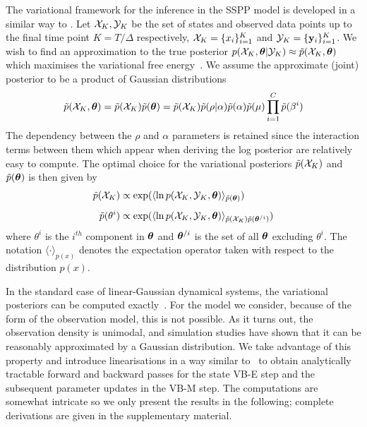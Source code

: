 \documentclass[12pt]{article}
\begin{document}
The variational framework for the inference in the SSPP model is developed in a similar way to
\cite{Beal_2003b}. Let $\mathcal{X}_K, \mathcal{Y}_K$ be the set of states and observed data points up to the final
time point $K = T/\Delta$ respectively, $\mathcal{X}_K = \{x_i\}_{i=1}^K$ and $\mathcal{Y}_K = \{{\bf y}_i\}_{i=1}^K$. We
wish to find an approximation to the true posterior $p(\mathcal{X}_K,{\bm \theta} | \mathcal{Y}_K) \approx
\tilde{p}(\mathcal{X}_K,{\bm \theta})$ which maximises the variational free energy~\cite{Attias_1999}. We assume the
approximate (joint) posterior to be a product of Gaussian distributions \begin{equation}\label{eq:
	VarApproximation} \pt(\X_K,\thetab)=
	\pt(\X_K)\pt(\thetab)=\pt(\X_K)\pt(\rho|\alpha)\pt(\alpha)\pt(\mu)\prod_{i=1}^C\pt(\beta^i)
\end{equation} The dependency between the $\rho$ and $\alpha$ parameters is retained since the
interaction terms between them which appear when deriving the log posterior are relatively easy to
compute.  The optimal choice for the variational posteriors $\tilde{p}(\mathcal{X}_K)$ and $\tilde{p}({\bm \theta})$  is then
given by \begin{subequations}\label{eq:VBmarginals} \begin{align} \pt(\X_K)&\propto \exp(\langle\ln
	p(\X_K,\Y_K,\thetab)\rangle_{\pt(\thetab)}) \label{eq:xkmarginal}\\[1ex]
	\pt(\theta^i)&\propto \exp(\langle\ln
	p(\X_K,\Y_K,\thetab)\rangle_{\pt(\X_K)\pt(\thetab^{/i})}) \label{eq:thetakmarginal}
\end{align} \end{subequations} \noindent where $\theta^i$ is the $i^{th}$ component in ${\bm \theta}$ and
${\bm \theta}^{/i}$ is the set of all ${\bm \theta}$ excluding  $\theta^i$. The notation $\langle \cdot
\rangle_{p(x)}$ denotes the expectation operator taken with respect to the distribution $p(x)$.

In the standard case of linear-Gaussian dynamical systems, the variational posteriors can be
computed exactly~\cite{Beal_2003b}. For the model we consider, because of the form of the
observation model, this is not possible. As it turns out, the observation density is unimodal, and
simulation studies have shown that it can be reasonably approximated by a Gaussian distribution. We
take advantage of this property and introduce linearisations in a way similar to~\cite{Smith_2003}
to obtain analytically tractable forward and backward passes for the state VB-E step and the
subsequent parameter updates in the VB-M step. The computations are somewhat intricate so we only present the results in the following; complete derivations are given in the supplementary material.
\end{document}
